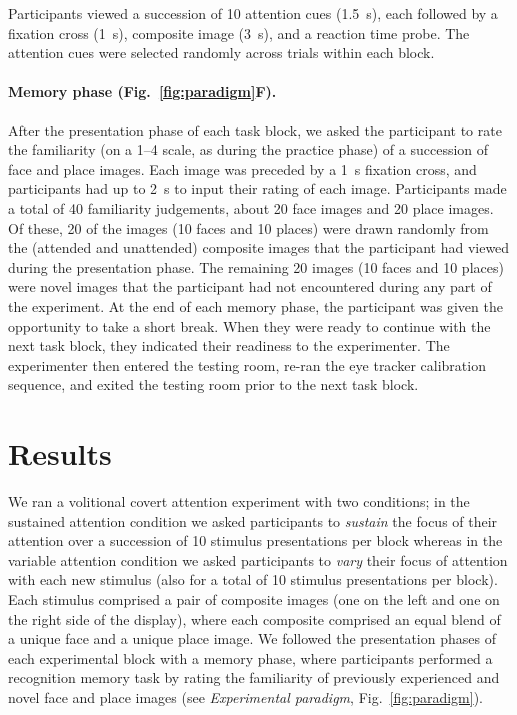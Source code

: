\documentclass[english]{article}
\begin{document}
Participants viewed a succession of 10 attention cues (1.5~s), each followed by
a fixation cross (1~s), composite image (3~s), and a reaction time probe. The
attention cues were selected randomly across trials within each block.

\paragraph*{Memory phase (Fig.~\ref{fig:paradigm}F).}

After the presentation phase of each task block, we asked the participant to
rate the familiarity (on a 1--4 scale, as during the practice phase) of a
succession of face and place images. Each image was preceded by a 1~s fixation
cross, and participants had up to 2~s to input their rating of each image.
Participants made a total of 40 familiarity judgements, about 20 face images
and 20 place images. Of these, 20 of the images (10 faces and 10 places) were
drawn randomly from the (attended and unattended) composite images that the
participant had viewed during the presentation phase. The remaining 20 images
(10 faces and 10 places) were novel images that the participant had not
encountered during any part of the experiment. At the end of each memory phase,
the participant was given the opportunity to take a short break. When they were
ready to continue with the next task block, they indicated their readiness to
the experimenter. The experimenter then entered the testing room, re-ran the
eye tracker calibration sequence, and exited the testing room prior to the next
task block.

\section*{Results}

We ran a volitional covert attention experiment with two conditions; in the
sustained attention condition we asked participants to \textit{sustain} the
focus of their attention over a succession of 10 stimulus presentations per
block whereas in the variable attention condition we asked participants to
\textit{vary} their focus of attention with each new stimulus (also for a total
of 10 stimulus presentations per block). Each stimulus comprised a pair of
composite images (one on the left and one on the right side of the display),
where each composite comprised an equal blend of a unique face and a unique
place image. We followed the presentation phases of each experimental block
with a memory phase, where participants performed a recognition memory task by
rating the familiarity of previously experienced and novel face and place
images (see \textit{Experimental paradigm}, Fig.~\ref{fig:paradigm}).
\end{document}
